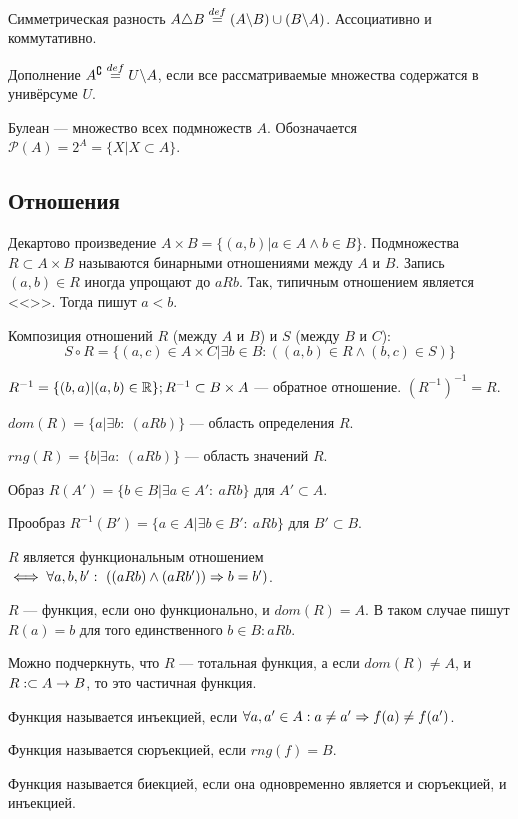 \documentclass[a4paper]{report}
\begin{document}
    Симметрическая разность $A \triangle B \overset{def}{=} (A \backslash B) \cup (B \backslash A)$.
    Ассоциативно и коммутативно.

    Дополнение $A{}^\complement \overset{def}{=} U \backslash A$, если все рассматриваемые множества содержатся в унивёрсуме $U$.

    Булеан --- множество всех подмножеств $A$.
    Обозначается $\mathcal{P}(A) = 2^A = \{X | X \subset A\}$.

    \subsection{Отношения}
    Декартово произведение $A \times B = \{ (a, b) | a \in A \land b \in B\}$.
    Подмножества $R \subset A\times B$ называются бинарными отношениями между $A$ и $B$.
    Запись $(a, b) \in R$ иногда упрощают до $aRb$.
    Так, типичным отношением является <<\text{<}>>.
    Тогда пишут $a<b$.

    Композиция отношений $R$ (между $A$ и $B$) и $S$ (между $B$ и $C$): \[S \circ R = \{ (a, c) \in A \times C | \exists b \in B: ((a, b) \in R \land (b, c) \in S)\}\]

    $R^{-1} = \{(b, a) | (a, b) \in \mathbb{R}\}; R^{-1} \subset B \times A$ --- обратное отношение. $\left(R^{-1}\right)^{-1} = R$.

    $dom(R) = \{a | \exists b :~(a R b) \}$ --- область определения $R$.

    $rng(R) = \{b | \exists a :~(a R b) \}$ --- область значений $R$.

    Образ $R(A') = \{b \in B | \exists a \in A':~a R b\}$ для $A' \subset A$.

    Прообраз $R^{-1}(B') =\{a \in A | \exists b \in B': ~ a R b\}$ для $B' \subset B$.

    $R$ является функциональным отношением $\iff \forall a, b, b':~((a R b) \land (a R b')) \Rightarrow b = b')$.

    $R$ --- функция, если оно функционально, и $dom(R) = A$.
    В таком случае пишут $R(a) = b$ для того единственного $b \in B: a R b$.

    Можно подчеркнуть, что $R$ --- тотальная функция, а если $dom(R) \ne A$, и $R : \subset A \rightarrow B$, то это частичная функция.

    Функция называется инъекцией, если $\forall a, a' \in A: a \ne a' \Rightarrow f(a) \ne f(a')$.

    Функция называется сюръекцией, если $rng(f) = B$.

    Функция называется биекцией, если она одновременно является и сюръекцией, и инъекцией.
\end{document}

